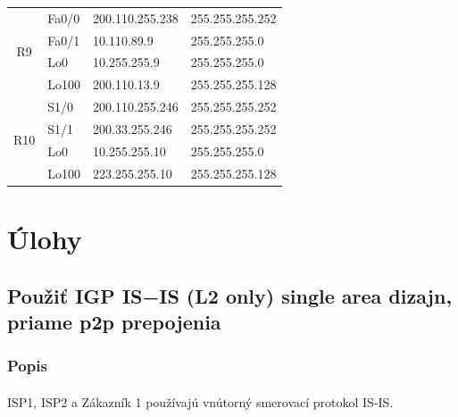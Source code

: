 \documentclass[12pt,twoside,a4paper]{report}
\begin{document}
\begin{table}[!htbp]
\begin{tabular}{|c|l|l|l|}
\multirow{4}{*}{R9}  & Fa0/0                                   & 200.110.255.238                         & 255.255.255.252                     \\ \cline{2-4} 
                     & Fa0/1                                   & 10.110.89.9                             & 255.255.255.0                       \\ \cline{2-4} 
                     & Lo0                                     & 10.255.255.9                            & 255.255.255.0                       \\ \cline{2-4} 
                     & Lo100                                   & 200.110.13.9                            & 255.255.255.128                     \\ \hline
\multirow{4}{*}{R10} & S1/0                                    & 200.110.255.246                         & 255.255.255.252                     \\ \cline{2-4} 
                     & S1/1                                    & 200.33.255.246                          & 255.255.255.252                     \\ \cline{2-4} 
                     & Lo0                                     & 10.255.255.10                           & 255.255.255.0                       \\ \cline{2-4} 
                     & Lo100                                   & 223.255.255.10                          & 255.255.255.128                     \\ \hline
\end{tabular}
\end{table}


\newpage

\section{Úlohy}
\subsection{Použiť IGP IS−IS (L2 only) single area dizajn, priame p2p prepojenia}
\subsubsection{Popis}
\paragraph{}
ISP1, ISP2 a Zákazník 1 používajú vnútorný smerovací protokol IS-IS.
\end{document}
